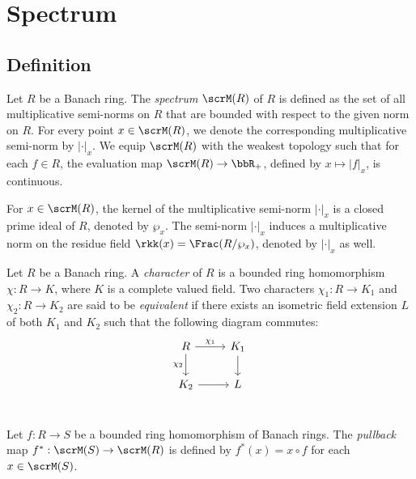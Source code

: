 \section{Spectrum}

\subsection{Definition}

    \begin{definition}\label{def:spectrum_of_Banach_rings}
        Let \(R\) be a Banach ring.
        The \emph{spectrum} \(\scrM(R)\) of \(R\) is defined as the set of all multiplicative semi-norms on \(R\) that are bounded with respect to the given norm on \(R\).
        For every point \(x \in \scrM(R)\), we denote the corresponding multiplicative semi-norm by \(|\cdot|_x\).
        We equip \(\scrM(R)\) with the weakest topology such that for each \(f \in R\), the evaluation map \(\scrM(R) \to \bbR_+\), defined by \(x \mapsto |f|_x\), is continuous.
    \end{definition}

    For \(x \in \scrM(R)\), the kernel of the multiplicative semi-norm \(|\cdot|_x\) is a closed prime ideal of \(R\), denoted by \(\wp_x\).
    The semi-norm \(|\cdot|_x\) induces a multiplicative norm on the residue field \(\rkk(x) = \Frac(R/\wp_x)\), denoted by \(|\cdot|_{x}\) as well. 

    \begin{definition}\label{def:character_of_banach_rings}
        Let \(R\) be a Banach ring.
        A \emph{character} of \(R\) is a bounded ring homomorphism \(\chi: R \to K\), where \(K\) is a complete valued field.
        Two characters \(\chi_1: R \to K_1\) and \(\chi_2: R \to K_2\) are said to be \emph{equivalent} if there exists an isometric field extension \(L\) of both \(K_1\) and \(K_2\) such that the following diagram commutes:
        \[
            \begin{tikzcd}
                R \arrow{r}{\chi_1} \arrow[d, "\chi_2"'] & K_1 \arrow{d} \\
                K_2 \arrow{r} & L \\
            \end{tikzcd}
        \]
    \end{definition}

    \begin{definition}\label{def:pullback_of_ring_homomorphism_of_banach_rings_on_spectrum}
        Let \(f: R \to S\) be a bounded ring homomorphism of Banach rings.
        The \emph{pullback} map \(f^*: \scrM(S) \to \scrM(R)\) is defined by \(f^*(x) = x \circ f\) for each \(x \in \scrM(S)\).
    \end{definition}

